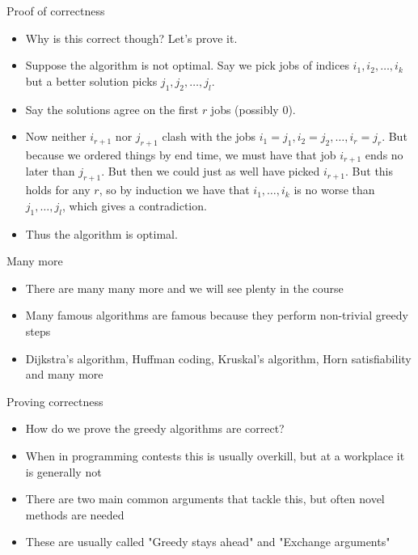 \documentclass{beamer}
\begin{document}
\begin{frame}[plain]{Proof of correctness}
    \begin{itemize}
        \item Why is this correct though? Let's prove it.
        \item Suppose the algorithm is not optimal. Say we pick jobs of indices $i_1, i_2, \dots, i_k$ but a better solution picks $j_1, j_2, \dots, j_l$.
        \item Say the solutions agree on the first $r$ jobs (possibly $0$). 
        \item Now neither $i_{r+1}$ nor $j_{r+1}$ clash with the jobs $i_1 = j_1, i_2 = j_2, \dots, i_r = j_r$. But because we ordered things by end time, we must have that job $i_{r+1}$ ends no later than $j_{r+1}$. But then we could just as well have picked $i_{r+1}$. But this holds for any $r$, so by induction we have that $i_1, \dots, i_k$ is no worse than $j_1, \dots, j_l$, which gives a contradiction.
        \item Thus the algorithm is optimal.
    \end{itemize}
\end{frame}

\begin{frame}[plain]{Many more}
    \begin{itemize}
        \item There are many many more and we will see plenty in the course
        \item Many famous algorithms are famous because they perform non-trivial greedy steps
        \item Dijkstra's algorithm, Huffman coding, Kruskal's algorithm, Horn satisfiability and many more
    \end{itemize}
\end{frame}

\begin{frame}[plain]{Proving correctness}
    \begin{itemize}
        \item How do we prove the greedy algorithms are correct?
        \item When in programming contests this is usually overkill, but at a workplace it is generally not
        \item There are two main common arguments that tackle this, but often novel methods are needed
        \item These are usually called "Greedy stays ahead" and "Exchange arguments"
    \end{itemize}
\end{frame}
\end{document}

